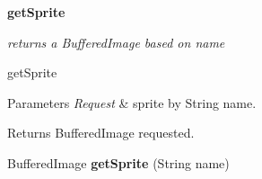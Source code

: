 \begin{Indent}{\bf get\+Sprite}\par
{\em returns a Buffered\+Image based on name

get\+Sprite


\begin{DoxyParams}{Parameters}
{\em Request} & sprite by String name. \\
\hline
\end{DoxyParams}
\begin{DoxyReturn}{Returns}
Buffered\+Image requested. 
\end{DoxyReturn}
}\begin{DoxyCompactItemize}
\item 
\hypertarget{classbattleship_1_1resources_1_1SpriteLoader_ac5b13477f8f16546bd99ec601910ed3c}{}Buffered\+Image {\bfseries get\+Sprite} (String name)\label{classbattleship_1_1resources_1_1SpriteLoader_ac5b13477f8f16546bd99ec601910ed3c}

\end{DoxyCompactItemize}
\end{Indent}
